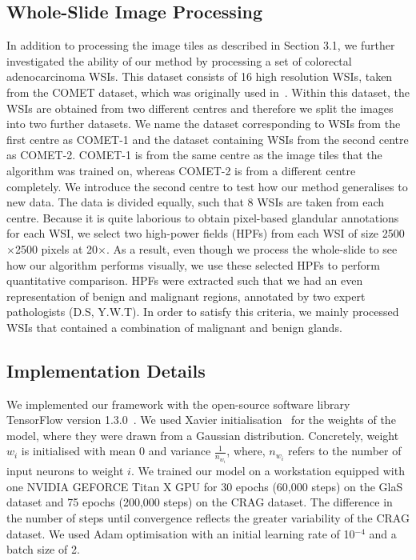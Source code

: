 \documentclass[3p]{elsarticle}
\begin{document}
\subsection{Whole-Slide Image Processing}
In addition to processing the image tiles as described in Section 3.1, we further investigated the ability of our method by processing a set of colorectal adenocarcinoma WSIs. This dataset consists of 16 high resolution WSIs, taken from the COMET dataset, which was originally used in~\cite{sirinukunwattana2016locality}. Within this dataset, the WSIs are obtained from two different centres and therefore we split the images into two further datasets. We name the dataset corresponding to WSIs from the first centre as COMET-1 and the dataset containing WSIs from the second centre as COMET-2. COMET-1 is from the same centre as the image tiles that the algorithm was trained on, whereas COMET-2 is from a different centre completely. We introduce the second centre to test how our method generalises to new data. The data is divided equally, such that 8 WSIs are taken from each centre. Because it is quite laborious to obtain pixel-based glandular annotations for each WSI, we select two high-power fields (HPFs) from each WSI of size 2500$\times$2500 pixels at 20$\times$. As a result, even though we process the whole-slide to see how our algorithm performs visually, we use these selected HPFs to perform quantitative comparison. HPFs were extracted such that we had an even representation of benign and malignant regions, annotated by two expert pathologists (D.S, Y.W.T). In order to satisfy this criteria, we mainly processed WSIs that contained a combination of malignant and benign glands.

\subsection{Implementation Details}
We implemented our framework with the open-source software library TensorFlow version 1.3.0~\citep{abadi2016tensorflow}. We used Xavier initialisation~\citep{glorot2010understanding} for the weights of the model, where they were drawn from a Gaussian distribution. Concretely, weight $w_i$ is initialised with mean 0 and variance $\frac{1}{n_{w_i}}$, where, $n_{w_i}$ refers to the number of input neurons to weight $i$. We trained our model on a workstation equipped with one NVIDIA GEFORCE Titan X GPU for 30 epochs (60,000 steps) on the GlaS dataset and 75 epochs (200,000 steps) on the CRAG dataset. The difference in the number of steps until convergence reflects the greater variability of the CRAG dataset. We used Adam optimisation with an initial learning rate of 10$^{-4}$ and a batch size of 2.
\end{document}
